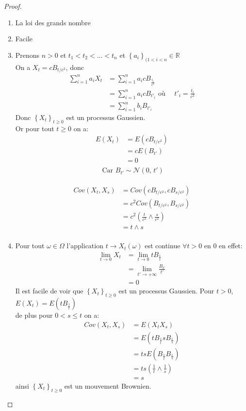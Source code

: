 \documentclass[A4paper,12pt]{report}
\begin{document}
\begin{proof}
\begin{enumerate}
\item La loi des grands nombre 
\item Facile 
\item Prenons $n > 0$ et $t_1<t_2<...<t_n$ et $\left\{a_{i}\right\}_{(1<i<n } \in  \mathbb{R}$ \\
On a  $X_{t}=c B_{t / c^2}$, donc
\begin{align*}  
\sum_{i=1}^{n} a_{i} X_{t} &=\sum_{i=1}^{n} a_{i} c B_{\frac{t_i}{c^{2}}} \\
                           &=\sum_{i=1}^{n} a_{i} c B_{t'_{i}} \text{ où } \quad t'_{i}=\frac{t_{i}}{c^{2}}\\
                           &=\sum_{i=1}^{n} b_{i} B_{t'_{i}}
\end{align*}
Donc $\left\{X_{t}\right\}_{t\geqslant 0}$ est un processus Gaussien.\\
Or pour tout $t\geqslant 0$ on a:
\begin{align*}  
E(X_t) &= E(c B_{t / c^2})\\
       &= cE(B_{t'})\\
       &=0 \\
\end{align*}
$$\text{ Car } B_{t'} \sim \mathcal{N}(0,\,t')$$\\
\begin{align*}
Cov(X_t, X_s) &= Cov(c B_{t / c^2},c B_{s / c^2})\\
              &= c^2 Cov(B_{t / c^2},B_{s / c^2})\\
              &= c^2 (\frac{t}{c^2} \wedge \frac{s}{c^2})\\
              &= t \wedge s\\
\end{align*}

\item Pour tout $\omega \in \Omega$ l'application $t \longrightarrow X_t (\omega)$ est continue $\forall t>0$ en 0 en effet:
\begin{align*}
\lim_{t \rightarrow 0} X_t &= \lim_{t \rightarrow 0}t B_{\frac{1}{t}}\\
                           &= \lim_{t' \rightarrow +\infty} \frac{B_{t'}}{t'} \\
                           &= 0
\end{align*}
Il est facile de voir que $\left\{X_{t}\right\}_{t\geqslant 0}$ est un processus Gaussien.
Pour $t>0$, $E(X_t)=E(tB_{\frac{1}{t}})$\\
de plus pour $0<s\leq t$ on a:
\begin{align*}
Cov(X_t, X_s) &= E(X_{t}X_{s})\\
              &= E( tB_{\frac{1}{t}} sB_{\frac{1}{s}})\\
              &= tsE(B_{\frac{1}{t}} B_{\frac{1}{s}})\\
              &= ts \left(\frac{1}{t} \wedge \frac{1}{s} \right)\\
              &=s
\end{align*}
ainsi $\left\{X_{t}\right\}_{t\geqslant 0}$ est un mouvement Brownien.
\end{enumerate}
\end{proof}
\end{document}
